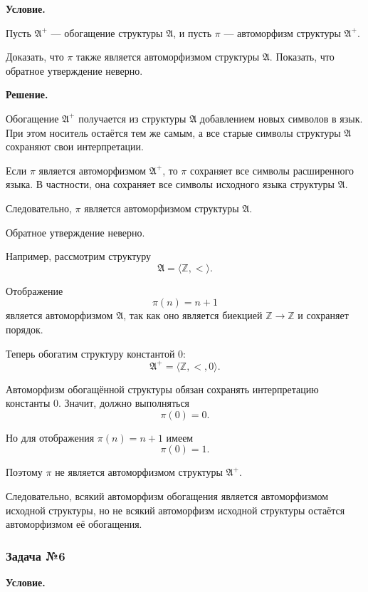 \documentclass[12pt,a4paper,oneside,openany]{book}
\theoremstyle{definition}
\theoremstyle{plain}
\theoremstyle{remark}
\begin{document}
\par\medskip
\textbf{Условие.}
\par\smallskip

Пусть $\mathfrak A^+$ — обогащение структуры $\mathfrak A$, и пусть $\pi$ — автоморфизм структуры $\mathfrak A^+$.

Доказать, что $\pi$ также является автоморфизмом структуры $\mathfrak A$. Показать, что обратное утверждение неверно.

\par\medskip
\textbf{Решение.}
\par\smallskip

Обогащение $\mathfrak A^+$ получается из структуры $\mathfrak A$ добавлением новых символов в язык. При этом носитель остаётся тем же самым, а все старые символы структуры $\mathfrak A$ сохраняют свои интерпретации.

Если $\pi$ является автоморфизмом $\mathfrak A^+$, то $\pi$ сохраняет все символы расширенного языка. В частности, она сохраняет все символы исходного языка структуры $\mathfrak A$.

Следовательно, $\pi$ является автоморфизмом структуры $\mathfrak A$.

Обратное утверждение неверно.

Например, рассмотрим структуру
\[
\mathfrak A=\langle \mathbb Z,<\rangle.
\]

Отображение
\[
\pi(n)=n+1
\]
является автоморфизмом $\mathfrak A$, так как оно является биекцией $\mathbb Z\to\mathbb Z$ и сохраняет порядок.

Теперь обогатим структуру константой $0$:
\[
\mathfrak A^+=\langle \mathbb Z,<,0\rangle.
\]

Автоморфизм обогащённой структуры обязан сохранять интерпретацию константы $0$. Значит, должно выполняться
\[
\pi(0)=0.
\]

Но для отображения $\pi(n)=n+1$ имеем
\[
\pi(0)=1.
\]

Поэтому $\pi$ не является автоморфизмом структуры $\mathfrak A^+$.

Следовательно, всякий автоморфизм обогащения является автоморфизмом исходной структуры, но не всякий автоморфизм исходной структуры остаётся автоморфизмом её обогащения.

\subsubsection*{Задача №6}

\par\medskip
\textbf{Условие.}
\par\smallskip
\end{document}
